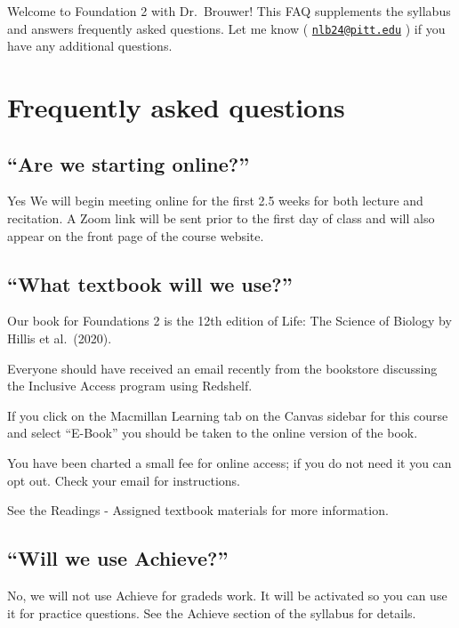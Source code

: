 \documentclass[
]{book}
\begin{document}
Welcome to Foundation 2 with Dr.~Brouwer! This FAQ supplements the syllabus and answers frequently asked questions. Let me know ( \href{mailto:nlb24@pitt.edu}{\nolinkurl{nlb24@pitt.edu}} ) if you have any additional questions.

\hypertarget{frequently-asked-questions}{%
\section{Frequently asked questions}\label{frequently-asked-questions}}

\hypertarget{are-we-starting-online}{%
\subsection{``Are we starting online?''}\label{are-we-starting-online}}

Yes We will begin meeting online for the first 2.5 weeks for both lecture and recitation. A Zoom link will be sent prior to the first day of class and will also appear on the front page of the course website.

\hypertarget{what-textbook-will-we-use}{%
\subsection{``What textbook will we use?''}\label{what-textbook-will-we-use}}

Our book for Foundations 2 is the 12th edition of Life: The Science of Biology by Hillis et al.~(2020).

Everyone should have received an email recently from the bookstore discussing the Inclusive Access program using Redshelf.

If you click on the Macmillan Learning tab on the Canvas sidebar for this course and select ``E-Book'' you should be taken to the online version of the book.

You have been charted a small fee for online access; if you do not need it you can opt out. Check your email for instructions.

See the Readings - Assigned textbook materials for more information.

\hypertarget{will-we-use-achieve}{%
\subsection{``Will we use Achieve?''}\label{will-we-use-achieve}}

No, we will not use Achieve for gradeds work. It will be activated so you can use it for practice questions. See the Achieve section of the syllabus for details.
\end{document}
